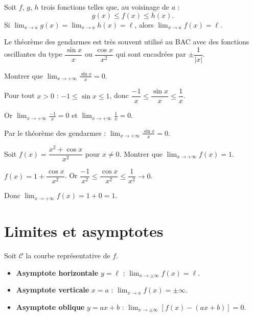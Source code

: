 \begin{theoreme}
	Soit $f$, $g$, $h$ trois fonctions telles que,
	au voisinage de $a$ :
	\[
	g(x) \leq f(x) \leq h(x).
	\]
	Si $\displaystyle\lim_{x\to a}g(x)=\lim_{x\to a}h(x)=\ell$,
	alors $\displaystyle\lim_{x\to a}f(x)=\ell$.
\end{theoreme}

\begin{astucebac}
	Le théorème des gendarmes est très souvent utilisé au BAC
	avec des fonctions oscillantes du type $\dfrac{\sin x}{x}$
	ou $\dfrac{\cos x}{x^2}$ qui sont encadrées par $\pm\dfrac{1}{|x|}$.
\end{astucebac}

\begin{exemple}
	Montrer que $\displaystyle\lim_{x\to+\infty}\frac{\sin x}{x}=0$.
	
	Pour tout $x>0$ : $-1\leq\sin x\leq 1$, donc
	$\dfrac{-1}{x}\leq\dfrac{\sin x}{x}\leq\dfrac{1}{x}$.
	
	Or $\displaystyle\lim_{x\to+\infty}\frac{-1}{x}=0$ et
	$\displaystyle\lim_{x\to+\infty}\frac{1}{x}=0$.
	
	Par le théorème des gendarmes :
	$\displaystyle\lim_{x\to+\infty}\frac{\sin x}{x}=0$.
\end{exemple}

\begin{exemple}
	Soit $f(x)=\dfrac{x^2+\cos x}{x^2}$ pour $x\neq 0$.
	Montrer que $\displaystyle\lim_{x\to+\infty}f(x)=1$.
	
	$f(x)=1+\dfrac{\cos x}{x^2}$. Or $\dfrac{-1}{x^2}\leq\dfrac{\cos x}{x^2}\leq\dfrac{1}{x^2}\to 0$.
	
	Donc $\displaystyle\lim_{x\to+\infty}f(x)=1+0=1$.
\end{exemple}

\section{Limites et asymptotes}

\begin{definition}
	Soit $\mathcal{C}$ la courbe représentative de $f$.
	\begin{itemize}
		\item \textbf{Asymptote horizontale} $y=\ell$ :
		$\displaystyle\lim_{x\to\pm\infty}f(x)=\ell$.
		\item \textbf{Asymptote verticale} $x=a$ :
		$\displaystyle\lim_{x\to a}f(x)=\pm\infty$.
		\item \textbf{Asymptote oblique} $y=ax+b$ :
		$\displaystyle\lim_{x\to\pm\infty}[f(x)-(ax+b)]=0$.
	\end{itemize}
\end{definition}

